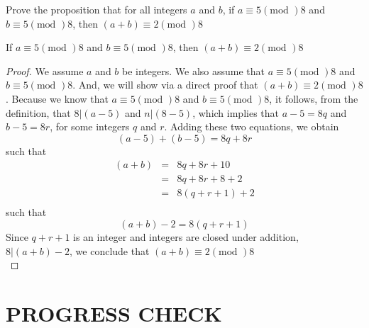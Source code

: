 \newpage
\begin{example}
Prove the proposition that for all integers $a$ and $b$, if $a \equiv 5 (\text{mod }) 8$ and $b \equiv 5 (\text{mod }) 8$, then $(a+b) \equiv 2 (\text{mod }) 8$ \\

\begin{tcolorbox}
	\begin{theorem}
		If $a \equiv 5 (\text{mod })8$ and $b \equiv 5 (\text{mod })8$, then $(a + b) \equiv 2 (\text{mod })8$
	\end{theorem}
\end{tcolorbox}

\begin{proof}
We assume $a$ and $b$ be integers. We also assume that $a \equiv 5 (\text{mod })8$ and $b \equiv 5 (\text{mod })8$. And, we will show via a direct proof that $(a + b) \equiv 2 (\text{mod })8$. Because we know that $a \equiv 5 (\text{mod })8$ and $b \equiv 5 (\text{mod })8$, it follows, from the definition, that   $8 | (a-5)$ and $n | (8-5)$, which implies that $a-5 = 8q$ and $b-5 = 8r$, for some integers $q$ and $r$. Adding these two equations, we obtain \[ (a-5) + (b-5) = 8q + 8r \]such that
	\begin{eqnarray}
	(a+b)& = & 8q + 8r + 10 \nonumber \\
	& = & 8q + 8r + 8 + 2 \nonumber \\
	& = & 8(q + r + 1) + 2 \nonumber \\
	\end{eqnarray}	 
such that \[ (a+b) - 2 = 8(q + r + 1) \] 
Since $q + r + 1$ is an integer and integers are closed under addition, $8 | (a+b) - 2$, we conclude that $(a+b) \equiv 2 (\text{mod })8$ \\
\end{proof}
\end{example}



























\newpage
\section{PROGRESS CHECK}

